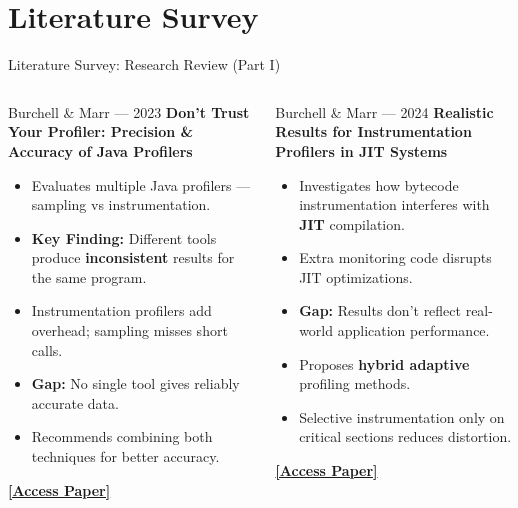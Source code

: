 \documentclass[aspectratio=169]{beamer}
\begin{document}
\section{Literature Survey}

\begin{frame}{Literature Survey: Research Review (Part I)}
  \footnotesize
  \begin{columns}[T]
      \begin{block}{\color{white}Burchell \& Marr — 2023}
        \textbf{Don't Trust Your Profiler: Precision \& Accuracy of Java Profilers}
        \begin{itemize}\scriptsize\itemsep3pt
          \item Evaluates multiple Java profilers — sampling vs instrumentation.
          \item \textbf{Key Finding:} Different tools produce \textbf{inconsistent} results
                for the same program.
          \item Instrumentation profilers add overhead; sampling misses short calls.
          \item \textbf{Gap:} No single tool gives reliably accurate data.
          \item Recommends combining both techniques for better accuracy.
        \end{itemize}
        \href{https://stefan-marr.de/downloads/mplr23-burchell-et-al-dont-trust-your-profiler.pdf}%
          {\textcolor{primary}{\textbf{[Access Paper]}}}
      \end{block}
      \begin{block}{\color{white}Burchell \& Marr — 2024}
        \textbf{Realistic Results for Instrumentation Profilers in JIT Systems}
        \begin{itemize}\scriptsize\itemsep3pt
          \item Investigates how bytecode instrumentation interferes with \textbf{JIT} compilation.
          \item Extra monitoring code disrupts JIT optimizations.
          \item \textbf{Gap:} Results don't reflect real-world application performance.
          \item Proposes \textbf{hybrid adaptive} profiling methods.
          \item Selective instrumentation only on critical sections reduces distortion.
        \end{itemize}
        \href{https://stefan-marr.de/downloads/mplr24-burchell-et-al-towards-realistic-results-for-instrumentation-based-profilers-for-jit-compiled-systems.pdf}%
          {\textcolor{primary}{\textbf{[Access Paper]}}}
      \end{block}
  \end{columns}
\end{frame}
\end{document}
